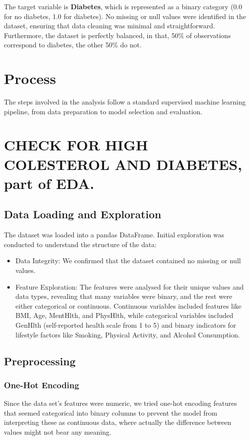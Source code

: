 \documentclass[a4paper,12pt]{article}
\begin{document}
The target variable is \textbf{Diabetes}, which is represented as a binary category 
(0.0 for no diabetes, 1.0 for diabetes). No missing or null values were identified in the dataset, 
ensuring that data cleaning was minimal and straightforward. Furthermore, the dataset is perfectly 
balanced, in that, 50\% of observations correspond to diabetes, the other 50\% do not.


\section{Process}
The steps involved in the analysis follow a standard supervised machine learning pipeline, 
from data preparation to model selection and evaluation.

\section{CHECK FOR HIGH COLESTEROL AND DIABETES, part of EDA.}

\subsection{Data Loading and Exploration}
The dataset was loaded into a pandas DataFrame. Initial exploration was conducted to understand 
the structure of the data:
\begin{itemize}
    \item Data Integrity: We confirmed that the dataset contained no missing or null values.
    \item Feature Exploration: The features were analysed for their unique values and data 
    types, revealing that many variables were binary, and the rest were either categorical or 
    continuous. Continuous variables included features like BMI, Age, MentHlth, and PhysHlth, 
    while categorical variables included GenHlth (self-reported health scale from 1 to 5) 
    and binary indicators for lifestyle factors like Smoking, Physical Activity, and Alcohol 
    Consumption.
\end{itemize}

\subsection{Preprocessing}
\subsubsection{One-Hot Encoding}
Since the data set's features were numeric, we tried one-hot encoding features that seemed categorical
into binary columns to prevent the model from interpreting these as continuous data, where actually
the difference between values might not bear any meaning. 
\end{document}
